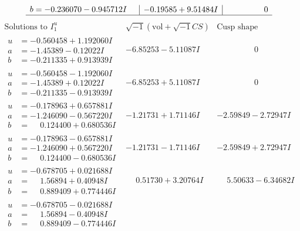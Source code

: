 \documentclass[1p]{elsarticle_modified}
\theoremstyle{definition}
\newcommand{\I}{\sqrt{-1}}
\begin{document}
$$\begin{array}{c|c|c}
\begin{aligned}
b &= -0.236070 - 0.945712 I\end{aligned}
 & -0.19585 + 9.51484 I & \phantom{-0.000000 } 0\\
 \hline 
 \end{array}$$\newpage$$\begin{array}{c|c|c}  
\text{Solutions to }I^u_{1}& \I (\text{vol} + \sqrt{-1}CS) & \text{Cusp shape}\\
 \hline 
\begin{aligned}
u &= -0.560458 + 1.192060 I \\
a &= -1.45389 - 0.12022 I \\
b &= -0.211335 + 0.913939 I\end{aligned}
 & -6.85253 - 5.11087 I & \phantom{-0.000000 } 0 \\ \hline\begin{aligned}
u &= -0.560458 - 1.192060 I \\
a &= -1.45389 + 0.12022 I \\
b &= -0.211335 - 0.913939 I\end{aligned}
 & -6.85253 + 5.11087 I & \phantom{-0.000000 } 0 \\ \hline\begin{aligned}
u &= -0.178963 + 0.657881 I \\
a &= -1.246090 - 0.567220 I \\
b &= \phantom{-}0.124400 + 0.680536 I\end{aligned}
 & -1.21731 + 1.71146 I & -2.59849 - 2.72947 I \\ \hline\begin{aligned}
u &= -0.178963 - 0.657881 I \\
a &= -1.246090 + 0.567220 I \\
b &= \phantom{-}0.124400 - 0.680536 I\end{aligned}
 & -1.21731 - 1.71146 I & -2.59849 + 2.72947 I \\ \hline\begin{aligned}
u &= -0.678705 + 0.021688 I \\
a &= \phantom{-}1.56894 + 0.40948 I \\
b &= \phantom{-}0.889409 + 0.774446 I\end{aligned}
 & \phantom{-}0.51730 + 3.20764 I & \phantom{-}5.50633 - 6.34682 I \\ \hline\begin{aligned}
u &= -0.678705 - 0.021688 I \\
a &= \phantom{-}1.56894 - 0.40948 I \\
b &= \phantom{-}0.889409 - 0.774446 I\end{aligned}

\end{array}$$
\end{document}
